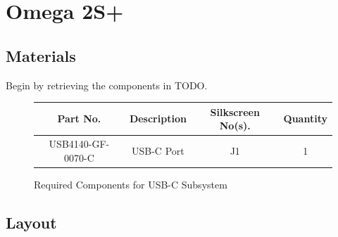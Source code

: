 \documentclass{article}
\newcommand{\resistor}[1]{$\text{#1} \Omega \text{ Resistor}$}
\begin{document}





\section{Omega 2S+}

\subsection{Materials}
Begin by retrieving the components in TODO.

\begin{figure}[H]
    \begin{center}
        \begin{tabular}{ c|c|c|c } 
            \textbf{Part No.} & \textbf{Description} & \textbf{Silkscreen No(s).} & \textbf{Quantity} \\ 
            \hline
            USB4140-GF-0070-C & USB-C Port & J1 & 1 \\ 
        \end{tabular}
    \end{center}
    \caption{Required Components for USB-C Subsystem}
    \label{tbl:TODO-materials}
\end{figure}

\subsection{Layout}
\end{document}
